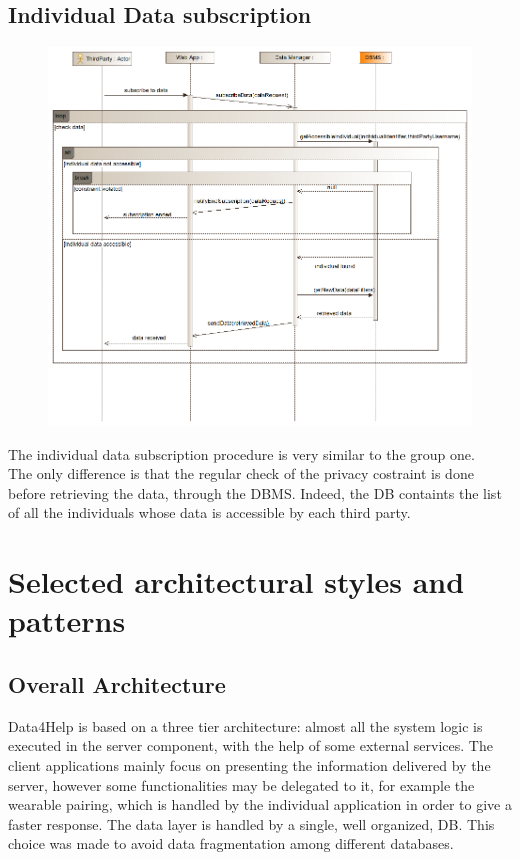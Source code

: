 \subsection{Individual Data subscription}
\begin{figure}[H]
\centering
\includegraphics[width=\linewidth]{resources/uml/sequence/IndividualDataSubscription.png}
\end{figure}
The individual data subscription procedure is very similar to the group one.\\
The only difference is that the regular check of the privacy costraint is done before retrieving the data, through the DBMS. Indeed, the DB containts the list of all the individuals whose data is accessible by each third party.\\ 


\section{Selected architectural styles and patterns}
\subsection{Overall Architecture}
Data4Help is based on a three tier architecture: almost all the system logic is executed in the server component, with the help of some external services.
The client applications mainly focus on presenting the information delivered by the server, however some functionalities may be delegated to it, for example the wearable pairing, which is handled by the individual application in order to give a faster response.
The data layer is handled by a single, well organized, DB. This choice was made to avoid data fragmentation among different databases.
\\

